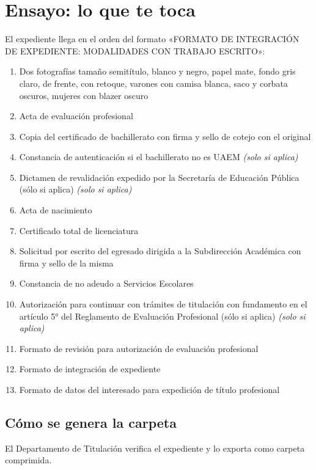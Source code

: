 \section{Ensayo: lo que te toca}
El expediente llega en el orden del formato «FORMATO DE INTEGRACIÓN DE EXPEDIENTE: MODALIDADES CON TRABAJO ESCRITO»:
\begin{enumerate}
  \item Dos fotografías tamaño semitítulo, blanco y negro, papel mate, fondo gris claro, de frente, con retoque, varones con camisa blanca, saco y corbata oscuros, mujeres con blazer oscuro
  \item Acta de evaluación profesional
  \item Copia del certificado de bachillerato con firma y sello de cotejo con el original
  \item Constancia de autenticación si el bachillerato no es UAEM \emph{(solo si aplica)}
  \item Dictamen de revalidación expedido por la Secretaría de Educación Pública (sólo si aplica) \emph{(solo si aplica)}
  \item Acta de nacimiento
  \item Certificado total de licenciatura
  \item Solicitud por escrito del egresado dirigida a la Subdirección Académica con firma y sello de la misma
  \item Constancia de no adeudo a Servicios Escolares
  \item Autorización para continuar con trámites de titulación con fundamento en el artículo 5° del Reglamento de Evaluación Profesional (sólo si aplica) \emph{(solo si aplica)}
  \item Formato de revisión para autorización de evaluación profesional
  \item Formato de integración de expediente
  \item Formato de datos del interesado para expedición de título profesional
\end{enumerate}
\subsection{Cómo se genera la carpeta}
El Departamento de Titulación verifica el expediente y lo exporta como carpeta comprimida.
